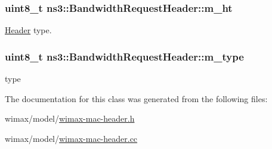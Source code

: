 \subsubsection[{\texorpdfstring{m\+\_\+ht}{m_ht}}]{\setlength{\rightskip}{0pt plus 5cm}uint8\+\_\+t ns3\+::\+Bandwidth\+Request\+Header\+::m\+\_\+ht\hspace{0.3cm}{\ttfamily [private]}}\hypertarget{classns3_1_1BandwidthRequestHeader_aa3c091baf3692d41a367aead455bbe8e}{}\label{classns3_1_1BandwidthRequestHeader_aa3c091baf3692d41a367aead455bbe8e}


\hyperlink{classns3_1_1Header}{Header} type. 

\subsubsection[{\texorpdfstring{m\+\_\+type}{m_type}}]{\setlength{\rightskip}{0pt plus 5cm}uint8\+\_\+t ns3\+::\+Bandwidth\+Request\+Header\+::m\+\_\+type\hspace{0.3cm}{\ttfamily [private]}}\hypertarget{classns3_1_1BandwidthRequestHeader_acbf2b6dc3bfefc47d08cf6edc673ec97}{}\label{classns3_1_1BandwidthRequestHeader_acbf2b6dc3bfefc47d08cf6edc673ec97}


type 



The documentation for this class was generated from the following files\+:\begin{DoxyCompactItemize}
\item 
wimax/model/\hyperlink{wimax-mac-header_8h}{wimax-\/mac-\/header.\+h}\item 
wimax/model/\hyperlink{wimax-mac-header_8cc}{wimax-\/mac-\/header.\+cc}\end{DoxyCompactItemize}
